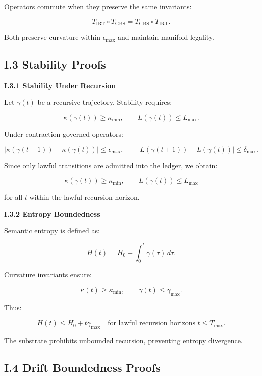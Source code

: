 Operators commute when they preserve the same invariants:


\[
T_{\mathrm{IRT}} \circ T_{\mathrm{GBS}}
= T_{\mathrm{GBS}} \circ T_{\mathrm{IRT}}.
\]


Both preserve curvature within $\epsilon_{\max}$ and maintain manifold legality.

\subsection*{I.3 Stability Proofs}

\textbf{I.3.1 Stability Under Recursion}

Let $\gamma(t)$ be a recursive trajectory. Stability requires:


\[
\kappa(\gamma(t)) \ge \kappa_{\min},
\qquad
L(\gamma(t)) \le L_{\max}.
\]



Under contraction-governed operators:


\[
|\kappa(\gamma(t+1)) - \kappa(\gamma(t))| \le \epsilon_{\max},
\qquad
|L(\gamma(t+1)) - L(\gamma(t))| \le \delta_{\max}.
\]



Since only lawful transitions are admitted into the ledger, we obtain:


\[
\kappa(\gamma(t)) \ge \kappa_{\min},
\qquad
L(\gamma(t)) \le L_{\max}
\]


for all $t$ within the lawful recursion horizon.

\textbf{I.3.2 Entropy Boundedness}

Semantic entropy is defined as:


\[
H(t) = H_0 + \int_0^t \gamma(\tau) \, d\tau.
\]



Curvature invariants ensure:


\[
\kappa(t) \ge \kappa_{\min},
\qquad
\gamma(t) \le \gamma_{\max}.
\]



Thus:


\[
H(t) \le H_0 + t \gamma_{\max}
\quad \text{for lawful recursion horizons } t \le T_{\max}.
\]



The substrate prohibits unbounded recursion, preventing entropy divergence.

\subsection*{I.4 Drift Boundedness Proofs}

